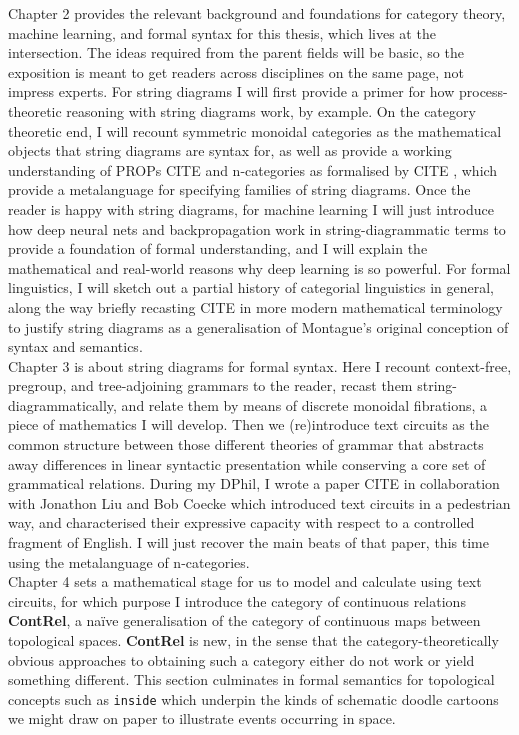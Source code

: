 Chapter 2 provides the relevant background and foundations for category theory, machine learning, and formal syntax for this thesis, which lives at the intersection. The ideas required from the parent fields will be basic, so the exposition is meant to get readers across disciplines on the same page, not impress experts. For string diagrams I will first provide a primer for how process-theoretic reasoning with string diagrams work, by example. On the category theoretic end, I will recount symmetric monoidal categories as the mathematical objects that string diagrams are syntax for, as well as provide a working understanding of PROPs \bR CITE \e and n-categories as formalised by \bR CITE \e, which provide a metalanguage for specifying families of string diagrams. Once the reader is happy with string diagrams, for machine learning I will just introduce how deep neural nets and backpropagation work in string-diagrammatic terms to provide a foundation of formal understanding, and I will explain the mathematical and real-world reasons why deep learning is so powerful. For formal linguistics, I will sketch out a partial history of categorial linguistics in general, along the way briefly recasting \bR CITE \e in more modern mathematical terminology to justify string diagrams as a generalisation of Montague's original conception of syntax and semantics.\\

Chapter 3 is about string diagrams for formal syntax. Here I recount context-free, pregroup, and tree-adjoining grammars to the reader, recast them string-diagrammatically, and relate them by means of discrete monoidal fibrations, a piece of mathematics I will develop. Then we (re)introduce text circuits as the common structure between those different theories of grammar that abstracts away differences in linear syntactic presentation while conserving a core set of grammatical relations. During my DPhil, I wrote a paper \bR CITE \e in collaboration with Jonathon Liu and Bob Coecke which introduced text circuits in a pedestrian way, and characterised their expressive capacity with respect to a controlled fragment of English. I will just recover the main beats of that paper, this time using the metalanguage of n-categories.\\

Chapter 4 sets a mathematical stage for us to model and calculate using text circuits, for which purpose I introduce the category of continuous relations \textbf{ContRel}, a na\"{i}ve generalisation of the category of continuous maps between topological spaces. \textbf{ContRel} is new, in the sense that the category-theoretically obvious approaches to obtaining such a category either do not work or yield something different. This section culminates in formal semantics for topological concepts such as \texttt{inside} which underpin the kinds of schematic doodle cartoons we might draw on paper to illustrate events occurring in space.\\

